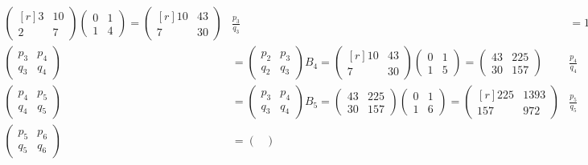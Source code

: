 \begin{loesung}
\begin{align*}
\begin{pmatrix*}[r]
3&10\\
2& 7
\end{pmatrix*}
\begin{pmatrix}
0&1\\
1&4
\end{pmatrix}
=
\begin{pmatrix*}[r]
10&43\\
 7&30
\end{pmatrix*}
&
\frac{p_3}{q_3}
&=
1.\underline{433}333333333333348
\\
\begin{pmatrix}
p_3&p_4\\
q_3&q_4
\end{pmatrix}
&=
\begin{pmatrix}
p_2&p_3\\
q_2&q_3
\end{pmatrix}
B_4
=
\begin{pmatrix*}[r]
10&43\\
 7&30
\end{pmatrix*}
\begin{pmatrix}
0&1\\
1&5
\end{pmatrix}
=
\begin{pmatrix}
43&225\\
30&157
\end{pmatrix}
&
\frac{p_4}{q_4}
&=
1.\underline{43312}1019108280159
\\
\begin{pmatrix}
p_4&p_5\\
q_4&q_5
\end{pmatrix}
&=
\begin{pmatrix}
p_3&p_4\\
q_3&q_4
\end{pmatrix}
B_5
=
\begin{pmatrix}
43&225\\
30&157
\end{pmatrix}
\begin{pmatrix}
0&1\\
1&6
\end{pmatrix}
=
\begin{pmatrix*}[r]
225&1393\\
157& 972
\end{pmatrix*}
&
\frac{p_5}{q_5}
&=
1.\underline{433127}572016460904
\\
\begin{pmatrix}
p_5&p_6\\
q_5&q_6
\end{pmatrix}
&=
\begin{pmatrix}

\end{pmatrix}
\end{align*}
\end{loesung}
